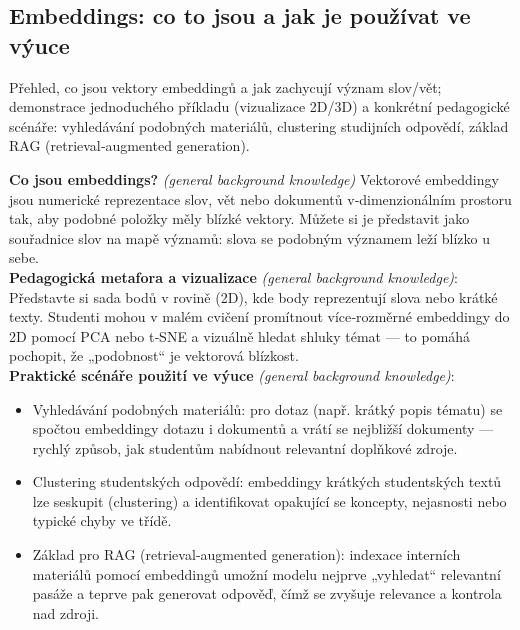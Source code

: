\documentclass{report}%
\begin{document}
%
\subsection{Embeddings: co to jsou a jak je používat ve výuce}%
Přehled, co jsou vektory embeddingů a jak zachycují význam slov/vět; demonstrace jednoduchého příkladu (vizualizace 2D/3D) a konkrétní pedagogické scénáře: vyhledávání podobných materiálů, clustering studijních odpovědí, základ RAG (retrieval‑augmented generation).%


%
\noindent\textbf{Co jsou embeddings?} \emph{(general background knowledge)} Vektorové embeddingy jsou numerické reprezentace slov, vět nebo dokumentů v‑dimenzionálním prostoru tak, aby podobné položky měly blízké vektory. Můžete si je představit jako souřadnice slov na mapě významů: slova se podobným významem leží blízko u sebe.\\

\noindent\textbf{Pedagogická metafora a vizualizace} \emph{(general background knowledge)}: Představte si sada bodů v rovině (2D), kde body reprezentují slova nebo krátké texty. Studenti mohou v malém cvičení promítnout více‑rozměrné embeddingy do 2D pomocí PCA nebo t‑SNE a vizuálně hledat shluky témat — to pomáhá pochopit, že „podobnost“ je vektorová blízkost.\\

\noindent\textbf{Praktické scénáře použití ve výuce} \emph{(general background knowledge)}:
\begin{itemize}
  \item Vyhledávání podobných materiálů: pro dotaz (např. krátký popis tématu) se spočtou embeddingy dotazu i dokumentů a vrátí se nejbližší dokumenty — rychlý způsob, jak studentům nabídnout relevantní doplňkové zdroje.
  \item Clustering studentských odpovědí: embeddingy krátkých studentských textů lze seskupit (clustering) a identifikovat opakující se koncepty, nejasnosti nebo typické chyby ve třídě.
  \item Základ pro RAG (retrieval‑augmented generation): indexace interních materiálů pomocí embeddingů umožní modelu nejprve „vyhledat“ relevantní pasáže a teprve pak generovat odpověď, čímž se zvyšuje relevance a kontrola nad zdroji.
\end{itemize}
\end{document}
